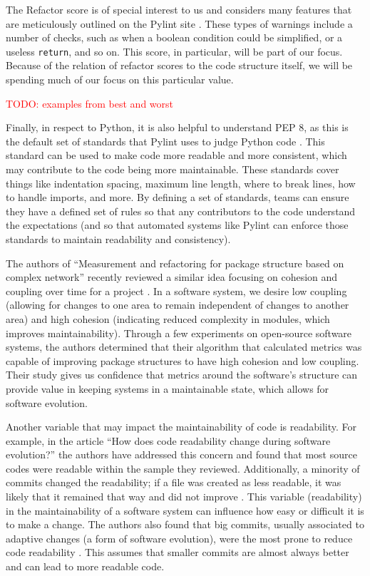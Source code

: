 \documentclass[12pt,conference]{IEEEtran}
\newcommand\todo[1]{\textcolor{red}{#1}}
\newcommand{\code}[1]{\texttt{#1}}
\begin{document}
The Refactor score is of special interest to us and considers many features that are meticulously outlined on the Pylint site \cite{pylint:refactor}. These types of warnings include a number of checks, such as when a boolean condition could be simplified, or a useless \code{return}, and so on. This score, in particular, will be part of our focus. Because of the relation of refactor scores to the code structure itself, we will be spending much of our focus on this particular value.

\todo{TODO: examples from best and worst}

Finally, in respect to Python, it is also helpful to understand PEP 8, as this is the default set of standards that Pylint uses to judge Python code \cite{pylint:pep8}. This standard can be used to make code more readable and more consistent, which may contribute to the code being more maintainable. These standards cover things like indentation spacing, maximum line length, where to break lines, how to handle imports, and more. By defining a set of standards, teams can ensure they have a defined set of rules so that any contributors to the code understand the expectations (and so that automated systems like Pylint can enforce those standards to maintain readability and consistency).


The authors of ``Measurement and refactoring for package structure based on complex network'' recently reviewed a similar idea focusing on cohesion and coupling over time for a project \cite{zhou:2020}. In a software system, we desire low coupling (allowing for changes to one area to remain independent of changes to another area) and high cohesion (indicating reduced complexity in modules, which improves maintainability). Through a few experiments on open-source software systems, the authors determined that their algorithm that calculated metrics was capable of improving package structures to have high cohesion and low coupling. Their study gives us confidence that metrics around the software's structure can provide value in keeping systems in a maintainable state, which allows for software evolution.

Another variable that may impact the maintainability of code is readability. For example, in the article ``How does code readability change during software evolution?'' the authors have addressed this concern and found that most source codes were readable within the sample they reviewed. Additionally, a minority of commits changed the readability; if a file was created as less readable, it was likely that it remained that way and did not improve \cite{piantadosi:2020}. This variable (readability) in the maintainability of a software system can influence how easy or difficult it is to make a change. The authors also found that big commits, usually associated to adaptive changes (a form of software evolution), were the most prone to reduce code readability \cite{piantadosi:2020}. This assumes that smaller commits are almost always better and can lead to more readable code.
\end{document}
